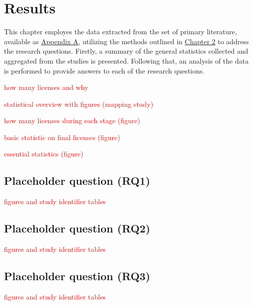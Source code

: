 \chapter{Results\label{results}}
This chapter employes the data extracted from the set of primary literature, available as \hyperref[appendix:a]{Appendix A}, utilizing the methods outlined in \hyperref[methods]{Chapter 2} to address the research questions. Firstly, a summary of the general statistics collected and aggregated from the studies is presented. Following that, an analysis of the data is performed to provide answers to each of the research questions.

\textcolor{red}{how many licenses and why}

\textcolor{red}{statistical overview with figures (mapping study)}

\textcolor{red}{how many licenses during each stage (figure)}

\textcolor{red}{basic statistic on final licenses (figure)}

\textcolor{red}{essential statistics (figure)}

\section{Placeholder question (RQ1)}
\textcolor{red}{figures and study identifier tables}
\section{Placeholder question (RQ2)}
\textcolor{red}{figures and study identifier tables}
\section{Placeholder question (RQ3)}
\textcolor{red}{figures and study identifier tables}
